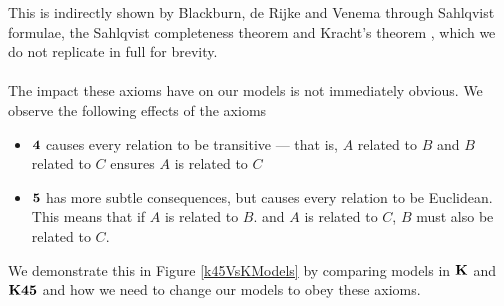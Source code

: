 This is indirectly shown by Blackburn, de Rijke and Venema \cite{blackburn2002modal} through Sahlqvist formulae, the Sahlqvist
completeness theorem and Kracht's theorem \cite{2594394}, which we do not replicate in full for brevity.\\
\\
The impact these axioms have on our models is not immediately obvious.
We observe the following effects of the axioms
\begin{itemize}
	\item $\bf 4$ causes every relation to be transitive --- that is, $A$ related to $B$ and $B$
		related to $C$ ensures $A$ is related to $C$
	\item $\bf 5$ has more subtle consequences, but causes every relation to be Euclidean. This means
		that if $A$ is related to $B$.
    and $A$ is related to $C$, $B$ must also be related to $C$.
\end{itemize}

We demonstrate this in Figure \ref{k45VsKModels} by comparing models in $\bf K$ and $\bf K45$ and how we need to change
our models to obey these axioms.

